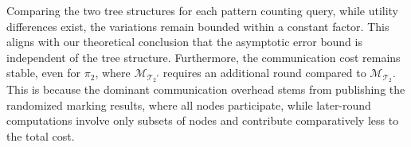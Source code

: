 \begin{table}[!hbtp]
\centering
\small
\caption{
Relative error (\%) and communication cost (MB) for acyclic pattern queries $Q_{\pi_1}$ and $Q_{\pi_2}$ using different tree structures on three datasets.
}
\label{tab:pattern_alt_trees}
\end{table}




Comparing the two tree structures for each pattern counting query, {while utility differences exist, the variations remain bounded within a constant factor. 
This aligns with our theoretical conclusion that the asymptotic error bound is independent of the tree structure.}
Furthermore, the communication cost remains stable, even for $\pi_2$, where $\mathcal{M}_{\mathcal{T}_2'}$ requires an additional round compared to $\mathcal{M}_{\mathcal{T}_2}$.
This is because the dominant communication overhead stems from publishing the randomized marking results, where all nodes participate, while later-round computations involve only subsets of nodes and contribute comparatively less to the total cost.



